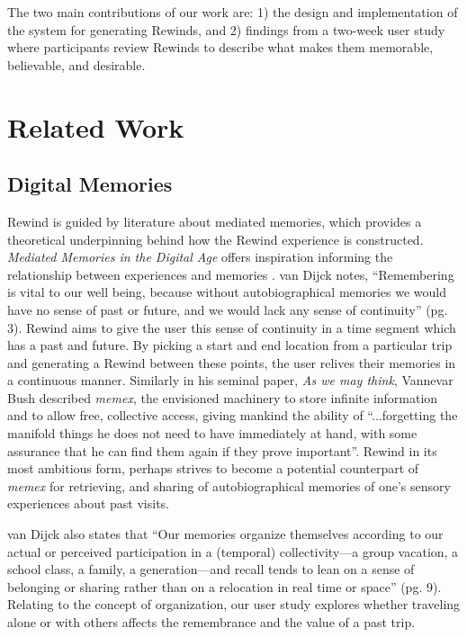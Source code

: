 \documentclass{sigchi}
\begin{document}
The two main contributions of our work are: 1) the design and implementation of the system for generating Rewinds, and 2) findings from a two-week user study where participants review Rewinds to describe what makes them memorable, believable, and desirable.

\section{Related Work}
\subsection{Digital Memories}
Rewind is guided by literature about mediated memories, which provides a theoretical underpinning behind how the Rewind experience is constructed. \textit{Mediated Memories in the Digital Age} offers inspiration informing the relationship between experiences and memories \cite{van2007mediated}. van Dijck notes, ``Remembering is vital to our well being, because without autobiographical memories we would have no sense of past or future, and we would lack any sense of continuity'' (pg. 3). Rewind aims to give the user this sense of continuity in a time segment which has a past and future. By picking a start and end location from a particular trip and generating a Rewind between these points, the user relives their memories in a continuous manner. Similarly in his seminal paper, \textit{As we may think}, Vannevar Bush described \textit{memex}, the envisioned machinery to store infinite information and to allow free, collective access, giving mankind the ability of ``...forgetting the manifold things he does not need to have immediately at hand, with some assurance that he can find them again if they prove important''. Rewind in its most ambitious form, perhaps strives to become a potential counterpart of \textit{memex} for retrieving, and sharing of autobiographical memories of one's sensory experiences about past visits.

van Dijck also states that ``Our memories organize themselves according to our actual or perceived participation in a (temporal) collectivity---a group vacation, a school class, a family, a generation---and recall tends to lean on a sense of belonging or sharing rather than on a relocation in real time or space'' (pg. 9). Relating to the concept of organization, our user study explores whether traveling alone or with others affects the remembrance and the value of a past trip. 
\end{document}
